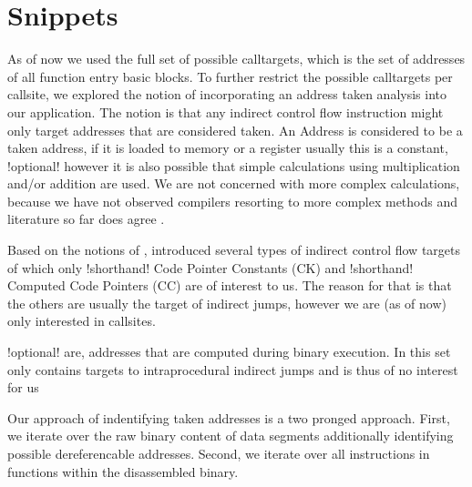 \part{Snippets} 


As of now we used the full set of possible calltargets, which is the set of addresses of all function entry basic blocks. To further restrict the possible calltargets per callsite, we explored the notion of incorporating an address taken analysis into our application. The notion is that any indirect control flow instruction might only target addresses that are considered {taken}. An Address is considered to be a {taken} address, if it is loaded to memory or a register usually this is a constant, {!optional! however it is also possible that simple calculations using multiplication and/or addition are used. We are not concerned with more complex calculations, because we have not observed compilers resorting to more complex methods and literature so far does agree \cite{ZhangSekar00}}.

Based on the notions of \cite{ZhangSekar00}, introduced several types of indirect control flow targets of which only {!shorthand! Code Pointer Constants (CK)} and {!shorthand! Computed Code Pointers (CC)} are of interest to us. The reason for that is that the others are usually the target of indirect jumps, however we are (as of now) only interested in callsites.


{!optional!
 { are, addresses that are computed during binary execution. In \cite{ZhangSekar00}  this set only contains targets to intraprocedural indirect jumps and is thus of no interest for us} }

Our approach of indentifying taken addresses is a two pronged approach. First, we iterate over the raw binary content of data segments additionally identifying possible dereferencable addresses. Second, we iterate over all instructions in functions within the disassembled binary.


